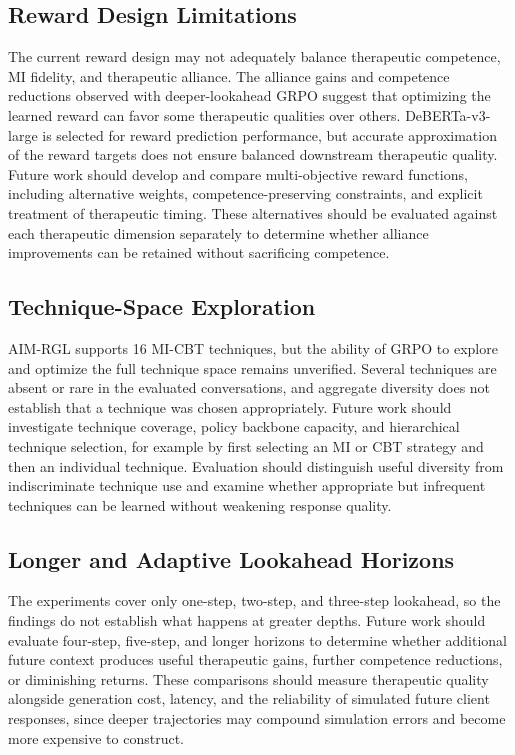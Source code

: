 \subsection{Reward Design Limitations}

The current reward design may not adequately balance therapeutic competence, MI fidelity, and therapeutic alliance. The alliance gains and competence reductions observed with deeper-lookahead GRPO suggest that optimizing the learned reward can favor some therapeutic qualities over others. DeBERTa-v3-large is selected for reward prediction performance, but accurate approximation of the reward targets does not ensure balanced downstream therapeutic quality. Future work should develop and compare multi-objective reward functions, including alternative weights, competence-preserving constraints, and explicit treatment of therapeutic timing. These alternatives should be evaluated against each therapeutic dimension separately to determine whether alliance improvements can be retained without sacrificing competence.

\subsection{Technique-Space Exploration}

AIM-RGL supports 16 MI-CBT techniques, but the ability of GRPO to explore and optimize the full technique space remains unverified. Several techniques are absent or rare in the evaluated conversations, and aggregate diversity does not establish that a technique was chosen appropriately. Future work should investigate technique coverage, policy backbone capacity, and hierarchical technique selection, for example by first selecting an MI or CBT strategy and then an individual technique. Evaluation should distinguish useful diversity from indiscriminate technique use and examine whether appropriate but infrequent techniques can be learned without weakening response quality.

\subsection{Longer and Adaptive Lookahead Horizons}

The experiments cover only one-step, two-step, and three-step lookahead, so the findings do not establish what happens at greater depths. Future work should evaluate four-step, five-step, and longer horizons to determine whether additional future context produces useful therapeutic gains, further competence reductions, or diminishing returns. These comparisons should measure therapeutic quality alongside generation cost, latency, and the reliability of simulated future client responses, since deeper trajectories may compound simulation errors and become more expensive to construct.

